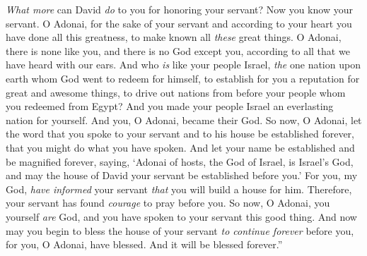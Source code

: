 \begin{biblechapter}
\verse \textit{What more} can David \textit{do} to you for honoring your servant? Now you know your servant.
\verse O Adonai, for the sake of your servant and according to your heart you have done all this greatness, to make known all \textit{these} great things.
\verse O Adonai, there is none like you, and there is no God except you, according to all that we have heard with our ears.
\verse And who \textit{is} like your people Israel, \textit{the} one nation upon earth whom God went to redeem for himself, to establish for you a reputation for great and awesome things, to drive out nations from before your people whom you redeemed from Egypt?
\verse And you made your people Israel an everlasting nation for yourself. And you, O Adonai, became their God.
\verse So now, O Adonai, let the word that you spoke to your servant and to his house be established forever, that you might do what you have spoken.
\verse And let your name be established and be magnified forever, saying, ‘Adonai of hosts, the God of Israel, is Israel’s God, and may the house of David your servant be established before you.’
\verse For you, my God, \textit{have informed} your servant \textit{that} you will build a house for him. Therefore, your servant has found \textit{courage} to pray before you.
\verse So now, O Adonai, you yourself \textit{are} God, and you have spoken to your servant this good thing.
\verse And now may you begin to bless the house of your servant \textit{to continue forever} before you, for you, O Adonai, have blessed. And it will be blessed forever.”
\end{biblechapter}

